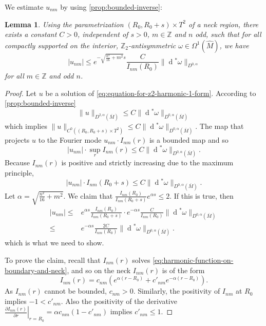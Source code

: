 \documentclass[preprint,12pt]{elsarticle}
\numberwithin{table}{section}
\newtheorem{lemma}{Lemma}[section]
\newcommand{\Z}{\mathbb{Z}}
\newcommand{\del}{\partial}
\renewcommand{\d}{\operatorname{d}\!}
\begin{document}
We estimate $u_{nm}$ by using \cref{prop:bounded-inverse}:
\begin{lemma}
	\label{lem:decay-rate-fourier-modes}
    Using the parametrization $(R_0, R_0 + s) \times T^2$ of a neck region, there exists a constant $C > 0$, independent of $s > 0$, $m \in \Z$ and $n$ odd, such that for all compactly supported on the interior, $\Z_2$-antisymmetric $\omega \in \Omega^1(\hat{M})$, we have
    $$
    |u_{nm}| \le e^{- \sqrt{\frac{n^2}{16} + m^2} s}  \frac{C}{I_{nm}(R_0)} \| \d ^* \omega \|_{D^{0, \alpha}}
    $$
    for all $m \in \Z$ and odd $n$.
\end{lemma}
\begin{proof}
    Let $u$ be a solution of \cref{eq:equation-for-z2-harmonic-1-form}.
    According to \cref{prop:bounded-inverse}
    $$
    \|u\|_{D^{2, \alpha} (\overline{M})} \le C \|\d^* \omega\|_{D^{0, \alpha}(\overline{M})}
    $$
    which implies $\|u\|_{C^{0}((R_0, R_0 + s) \times T^2)} \le C \|\d^* \omega\|_{D^{0, \alpha}(\overline{M})}.$
    The map that projects $u$ to the Fourier mode $u_{nm} \cdot I_{nm}(r)$ is a bounded map 
    and so
    $$
    |u_{nm}| \cdot \sup_{r} I_{nm}(r) \le C \|\d^* \omega\|_{D^{0, \alpha}(\overline{M})}.
    $$
    Because $I_{nm}(r)$ is positive and strictly increasing due to the maximum principle, 
    $$
    |u_{nm}| \cdot I_{nm}(R_0 + s) \le C \|\d^* \omega\|_{D^{0, \alpha}(\overline{M})}.
    $$
    Let $\alpha = \sqrt{\frac{n^2}{16} + m^2}$.
    We claim that $\frac{I_{nm}(R_0)}{I_{nm}(R_0 + s)} e^{\alpha s} \le 2$. 
    If this is true, then
    \begin{align}
        |u_{nm}| \le& e^{\alpha s} \frac{I_{nm}(R_0)}{I_{nm}(R_0 + s)} \cdot e^{- \alpha s} \frac{C}{I_{nm}(R_0)}  \|\d^* \omega\|_{D^{0, \alpha}(\overline{M})} \\
    \le& e^{- \alpha s} \frac{2C}{I_{nm}(R_0)}  \|\d^* \omega\|_{D^{0, \alpha}(\overline{M})}.
    \end{align}
    which is what we need to show.

    To prove the claim, recall that $I_{nm}(r)$ solves \cref{eq:harmonic-function-on-boundary-and-neck}, and so on the neck $I_{nm}(r)$ is of the form
    \begin{equation}
        \label{eq:estimate-of-behavior_I_nm}
        I_{nm}(r) = c_{nm} \left(e^{\alpha(r-R_0)} + c'_{nm} e^{-\alpha(r-R_0)}\right).
    \end{equation}
    As $I_{nm}(r)$ cannot be bounded, $c_{nm} > 0$. Similarly, the positivity of $I_{nm}$ at $R_0$ implies $-1 < c'_{nm}$. Also the positivity of the derivative $\left. \frac{\del I_{nm}(r)}{\del r}\right|_{r=R_0} = \alpha c_{nm} \left(1 - c'_{nm}\right)$ implies $c'_{nm} \le 1$.


\end{proof}
\end{document}
